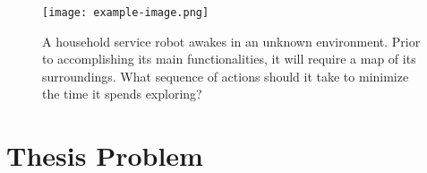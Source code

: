 \begin{figure}[t]
  \centering
  \texttt{[image: example-image.png]}
  \caption[A household service robot must explore its unknown environment.]{A household service robot awakes in an unknown environment. Prior to
  accomplishing its main functionalities, it will require a map of its surroundings.
What sequence of actions should it take to minimize the time it spends
exploring? \label{fig:motivation}}
\end{figure}




\section{Thesis Problem}

